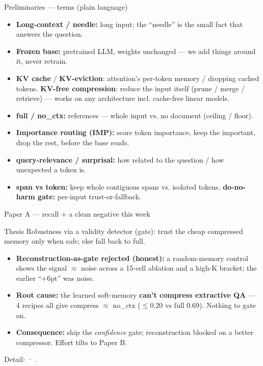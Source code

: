 \begin{frame}{Preliminaries --- terms (plain language)}
  \scriptsize
  \begin{itemize}
    \item \textbf{Long-context / needle:} long input; the ``needle'' is the small fact that answers the question.
    \item \textbf{Frozen base:} pretrained LLM, weights unchanged — we add things around it, never retrain.
    \item \textbf{KV cache} / \textbf{KV-eviction}: attention's per-token memory / dropping cached tokens. \textbf{KV-free compression}: reduce the input itself (prune / merge / retrieve) — works on any architecture incl. cache-free linear models.
    \item \textbf{full / no\_ctx:} references — whole input vs. no document (ceiling / floor).
    \item \textbf{Importance routing (IMP):} score token importance, keep the important, drop the rest, before the base reads.
    \item \textbf{query-relevance / surprisal:} how related to the question / how unexpected a token is.
    \item \textbf{span vs token:} keep whole contiguous spans vs. isolated tokens. \textbf{do-no-harm gate:} per-input trust-or-fallback.
  \end{itemize}
\end{frame}

\begin{frame}{Paper A --- recall + a clean negative this week}
  \small
  \begin{block}{Thesis}
    Robustness via a validity detector (gate): trust the cheap compressed memory only when safe; else fall back to full.
  \end{block}
  \begin{itemize}
    \item \textbf{Reconstruction-as-gate rejected (honest):} a random-memory control shows the signal $\approx$ noise across a 15-cell ablation and a high-K bracket; the earlier ``+6pt'' was noise.
    \item \textbf{Root cause:} the learned soft-memory \textbf{can't compress extractive QA} — 4 recipes all give compress $\approx$ no\_ctx ($\le$0.20 vs full 0.69). Nothing to gate on.
    \item \textbf{Consequence:} ship the \emph{confidence} gate; reconstruction blocked on a better compressor. Effort tilts to Paper B.
  \end{itemize}
  \scriptsize Detail:  · .
\end{frame}

